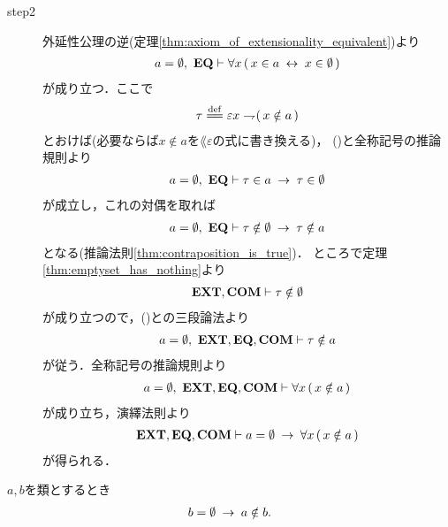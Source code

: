 \begin{prf}
\begin{description}
			\item[step2]
				外延性公理の逆(定理\ref{thm:axiom_of_extensionality_equivalent})より
				\begin{align}
					a = \emptyset,\ \mbox{{\bf EQ}} \vdash
					\forall x\, (\, x \in a \hspace{0.25em}\leftrightarrow\hspace{0.25em} x \in \emptyset\, )
					\label{fom:uniqueness_of_emptyset_3}
				\end{align}
				が成り立つ．ここで
				\begin{align}
					\tau \defeq \varepsilon x \negation (\, x \notin a\, )
				\end{align}
				とおけば(必要ならば$x \notin a$を$\lang{\varepsilon}$の式に書き換える)，
				()と全称記号の推論規則より
				\begin{align}
					a = \emptyset,\ \mbox{{\bf EQ}} \vdash \tau \in a \hspace{0.25em}\rightarrow\hspace{0.25em} \tau \in \emptyset
				\end{align}
				が成立し，これの対偶を取れば
				\begin{align}
					a = \emptyset,\ \mbox{{\bf EQ}} \vdash 
					\tau \notin \emptyset \hspace{0.25em}\rightarrow\hspace{0.25em} \tau \notin a
					\label{fom:uniqueness_of_emptyset_4}
				\end{align}
				となる(推論法則\ref{thm:contraposition_is_true})．
				ところで定理\ref{thm:emptyset_has_nothing}より
				\begin{align}
					\mbox{{\bf EXT}},\mbox{\bf COM} \vdash \tau \notin \emptyset
				\end{align}
				が成り立つので，()との三段論法より
				\begin{align}
					a = \emptyset,\ \mbox{{\bf EXT}},\mbox{{\bf EQ}},\mbox{\bf COM} \vdash \tau \notin a
				\end{align}
				が従う．全称記号の推論規則より
				\begin{align}
					a = \emptyset,\ \mbox{{\bf EXT}},\mbox{{\bf EQ}},\mbox{\bf COM} \vdash 
					\forall x\, (\, x \notin a\, )
				\end{align}
				が成り立ち，演繹法則より
				\begin{align}
					\mbox{{\bf EXT}},\mbox{{\bf EQ}},\mbox{\bf COM} \vdash 
					a = \emptyset \hspace{0.25em}\rightarrow\hspace{0.25em} \forall x\, (\, x \notin a\, )
				\end{align}
				が得られる．
				\QED
		\end{description}
	\end{prf}
	
	\begin{screen}
		\begin{thm}[空集合はいかなる類も持たない]
		\label{thm:emptyset_does_not_contain_any_class}
			$a,b$を類とするとき
			\begin{align}
				b = \emptyset \hspace{0.25em}\rightarrow\hspace{0.25em} a \notin b.
			\end{align}
		\end{thm}
	\end{screen}
	
